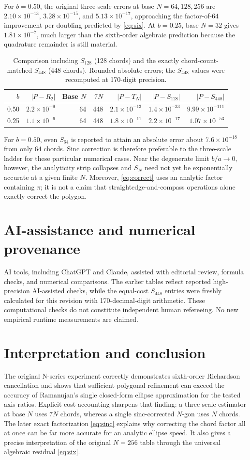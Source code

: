 \documentclass[11pt]{article}
\begin{document}
For $b=0.50$, the original three-scale errors at base $N=64,128,256$ are $2.10\times10^{-13}$, $3.28\times10^{-15}$, and $5.13\times10^{-17}$, approaching the factor-of-$64$ improvement per doubling predicted by \eqref{eq:six}. At $b=0.25$, base $N=32$ gives $1.81\times10^{-7}$, much larger than the sixth-order algebraic prediction because the quadrature remainder is still material.
\begin{table}[ht]
\centering\small
\begin{tabular}{@{}rrrrrrr@{}}\toprule
$b$ & $|P-R_2|$ & Base $N$ & $7N$ & $|P-T_N|$ & $|P-S_{128}|$ & $|P-S_{448}|$\\\midrule
0.50&$2.2\times10^{-9}$&64&448&$2.1\times10^{-13}$&$1.4\times10^{-33}$&$9.99\times10^{-111}$\\
0.25&$1.1\times10^{-6}$&64&448&$1.8\times10^{-11}$&$2.2\times10^{-17}$&$1.07\times10^{-53}$\\\bottomrule
\end{tabular}
\caption{Comparison including $S_{128}$ (128 chords) and the exactly chord-count-matched $S_{448}$ (448 chords). Rounded absolute errors; the $S_{448}$ values were recomputed at 170-digit precision.}\label{tab:new}
\end{table}
For $b=0.50$, even $S_{64}$ is reported to attain an absolute error about $7.6\times10^{-18}$ from only $64$ chords. Sinc correction is therefore preferable to the three-scale ladder for these particular numerical cases. Near the degenerate limit $b/a\to0$, however, the analyticity strip collapses and $S_N$ need not yet be exponentially accurate at a given finite $N$. Moreover, \eqref{eq:correct} uses an analytic factor containing $\pi$; it is not a claim that straightedge-and-compass operations alone exactly correct the polygon.
\section*{AI-assistance and numerical provenance}
AI tools, including ChatGPT and Claude, assisted with editorial review, formula checks, and numerical comparisons. The earlier tables reflect reported high-precision AI-assisted checks, while the equal-cost $S_{448}$ entries were freshly calculated for this revision with 170-decimal-digit arithmetic. These computational checks do not constitute independent human refereeing. No new empirical runtime measurements are claimed.
\section{Interpretation and conclusion}
The original N-series experiment correctly demonstrates sixth-order Richardson cancellation and shows that sufficient polygonal refinement can exceed the accuracy of Ramanujan's single closed-form ellipse approximation for the tested axis ratios. Explicit cost accounting sharpens that finding: a three-scale estimator at base $N$ uses $7N$ chords, whereas a single sinc-corrected $N$-gon uses $N$ chords. The later exact factorization \eqref{eq:sinc} explains why correcting the chord factor all at once can be far more accurate for an analytic ellipse speed. It also gives a precise interpretation of the original $N=256$ table through the universal algebraic residual \eqref{eq:six}.
\end{document}
